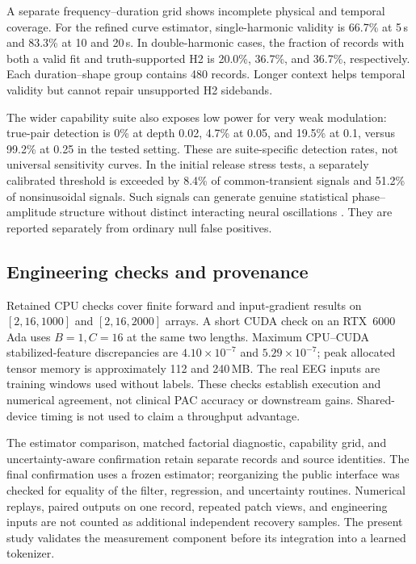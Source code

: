 \documentclass[10pt,twocolumn,letterpaper]{article}
\begin{document}
A separate frequency--duration grid shows incomplete physical and
temporal coverage. For the refined curve estimator, single-harmonic
validity is 66.7\% at 5\,s and 83.3\% at 10 and 20\,s. In
double-harmonic cases, the fraction of records with both a valid fit
and truth-supported H2 is 20.0\%, 36.7\%, and 36.7\%, respectively.
Each duration--shape group contains 480 records. Longer context helps
temporal validity but cannot repair unsupported H2 sidebands.

The wider capability suite also exposes low power for very weak
modulation: true-pair detection is 0\% at depth 0.02, 4.7\% at
0.05, and 19.5\% at 0.1, versus 99.2\% at 0.25 in the tested
setting. These are suite-specific detection rates, not universal
sensitivity curves. In the initial release stress tests, a separately
calibrated threshold is exceeded by 8.4\% of common-transient signals
and 51.2\% of nonsinusoidal signals. Such signals can generate genuine
statistical phase--amplitude structure without distinct interacting
neural oscillations \citep{aru2015untangling}. They are reported
separately from ordinary null false positives.

\subsection{Engineering checks and provenance}
Retained CPU checks cover finite forward and input-gradient results on
$[2,16,1000]$ and $[2,16,2000]$ arrays. A short CUDA check on an
RTX~6000 Ada uses $B=1,C=16$ at the same two lengths. Maximum
CPU--CUDA stabilized-feature discrepancies are
$4.10\times10^{-7}$ and $5.29\times10^{-7}$; peak allocated tensor
memory is approximately 112 and 240\,MB. The real EEG inputs are
training windows used without labels. These checks establish execution
and numerical agreement, not clinical PAC accuracy or downstream gains.
Shared-device timing is not used to claim a throughput advantage.

The estimator comparison, matched factorial diagnostic, capability
grid, and uncertainty-aware confirmation retain separate records and
source identities. The final confirmation uses a frozen estimator;
reorganizing the public interface was checked for equality of the
filter, regression, and uncertainty routines. Numerical replays,
paired outputs on one record, repeated patch views, and engineering
inputs are not counted as additional independent recovery samples.
The present study validates the measurement component before its
integration into a learned tokenizer.
\end{document}
